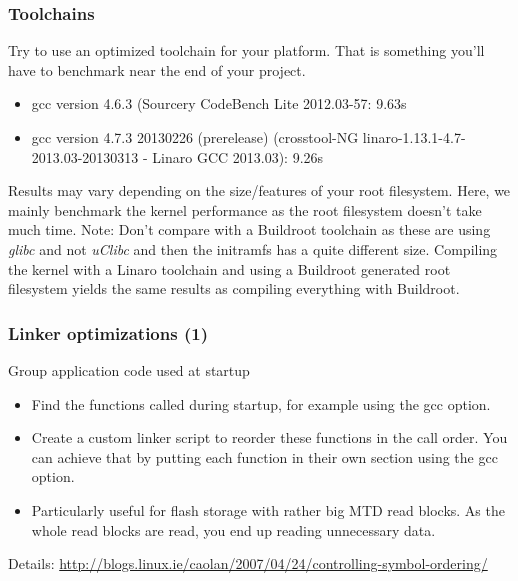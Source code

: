 \begin{frame}
\frametitle{Toolchains}
Try to use an optimized toolchain for your platform. That is something
you'll have to benchmark near the end of your project.
\begin{itemize}
        \item gcc version 4.6.3 (Sourcery CodeBench Lite 2012.03-57: 9.63s
        \item gcc version 4.7.3 20130226 (prerelease) (crosstool-NG
        linaro-1.13.1-4.7-2013.03-20130313 - Linaro GCC 2013.03): 9.26s
\end{itemize}
Results may vary depending on the size/features of your root filesystem.
Here, we mainly benchmark the kernel performance as the root filesystem
doesn't take much time. Note: Don't compare with a Buildroot toolchain as
these are using {\em glibc} and not {\em uClibc} and then
the initramfs has a quite different size. Compiling the kernel with a
Linaro toolchain and using a Buildroot generated root filesystem yields
the same results as compiling everything with Buildroot.
\end{frame}

\begin{frame}
\frametitle{Linker optimizations (1)}
Group application code used at startup
\begin{itemize}
        \item Find the functions called during startup, for example using
              the  gcc option.
        \item Create a custom linker script to reorder these functions in
              the call order. You can achieve that by putting each function
              in their own section using the  gcc
              option.
        \item Particularly useful for flash storage with rather big MTD
              read blocks. As the whole read blocks are read, you end up
              reading unnecessary data.
\end{itemize}
Details:
{\scriptsize
\url{http://blogs.linux.ie/caolan/2007/04/24/controlling-symbol-ordering/}}
\end{frame}

